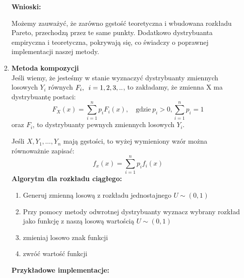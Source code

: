 \documentclass{article}
\begin{document}
\begin{enumerate}
		\textbf{Wnioski:} 
		
		Możemy zauważyć, że zarówno gęstość teoretyczna i wbudowana rozkładu Pareto, przechodzą przez te same punkty. Dodatkowo dystrybuanta empiryczna i teoretyczna, pokrywają się, co świadczy o poprawnej implementacji naszej metody. 
		
		\item \textbf{Metoda kompozycji}\\
		
		Jeśli wiemy, że jesteśmy w stanie wyznaczyć dystrybuanty zmiennych losowych $Y_{i}$ równych $F_{i},\hspace{0.5em} i=1,2,3,..$, to zakładamy, że zmienna X ma dystrybuantę postaci:
		$$F_{X}(x) = \sum_{i=1}^{n} p_{i}F_{i}(x),\hspace{1em}\text{gdzie}~p_{i} > 0, \sum_{i=1}^{n} p_{i} = 1$$ oraz $F_{i}$, to dystrybuanty pewnych zmiennych losowych $Y_{i}$.
		
		Jeśli $X,Y_{1},\ldots,Y_{n}$ mają gęstości, to wyżej wymieniony wzór można równoważnie zapisać:
		$$f_{x}(x) = \sum_{i=1}^{n}p_{i}f_{i}(x)$$
		\textbf{Algorytm dla rozkładu ciągłego:}
		\begin{enumerate}
			\item Generuj zmienną losową z rozkładu jednostajnego $U\sim(0,1)$
			\item Przy pomocy metody odwrotnej dystrybuanty wyznacz wybrany rozkład jako funkcję z naszą losową wartością $U\sim(0,1)$
			\item zmieniaj losowo znak funkcji 
			\item zwróć wartość funkcji 
		\end{enumerate}
		\textbf{Przykładowe implementacje:}
		

\end{enumerate}
\end{document}
